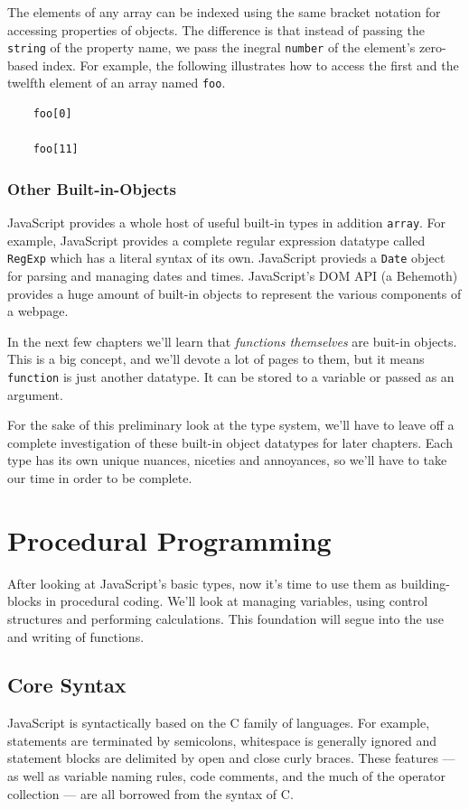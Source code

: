\documentclass[11pt,letter]{book}
\begin{document}
    The elements of any array can be indexed using the same bracket notation for accessing 
    properties of objects. The difference is that instead of passing the \texttt{string} of 
    the property name, we pass the inegral \texttt{number} of the element's zero-based index.
    For example, the following illustrates how to access the first and the twelfth element of an 
    array named \texttt{foo}.
    
    \begin{verbatim}
    foo[0]
    
    foo[11]
    \end{verbatim}
    
    \subsection{Other Built-in-Objects}
    JavaScript provides a whole host of useful built-in types in addition \texttt{array}. For 
    example, JavaScript provides a complete regular expression datatype called \texttt{RegExp} which
    has a literal syntax of its own. JavaScript provieds a \texttt{Date} object for parsing and 
    managing dates and times. JavaScript's DOM API (a Behemoth) provides a huge amount of built-in 
    objects to represent the various components of a webpage.
    
    In the next few chapters we'll learn that \emph{functions themselves} are buit-in objects. This 
    is a big concept, and we'll devote a lot of pages to them, but it means \texttt{function} is 
    just another datatype. It can be stored to a variable or passed as an argument.
    
    For the sake of this preliminary look at the type system, we'll have to leave off a complete 
    investigation of these built-in object datatypes for later chapters. Each type has its own 
    unique nuances, niceties and annoyances, so we'll have to take our time in order to be complete.
    
    \chapter{Procedural Programming}
    After looking at JavaScript's basic types, now it's time to use them as building-blocks in 
    procedural coding. We'll look at managing variables, using control structures and performing 
    calculations. This foundation will segue into the use and writing of functions.
    
    \section{Core Syntax}
    JavaScript is syntactically based on the C family of languages. For example, statements are 
    terminated by semicolons, whitespace is generally ignored and statement blocks are delimited by 
    open and close curly braces. These features --- as well as variable naming rules, code comments, 
    and the much of the operator collection --- are all borrowed from the syntax of C.
    
\end{document}
